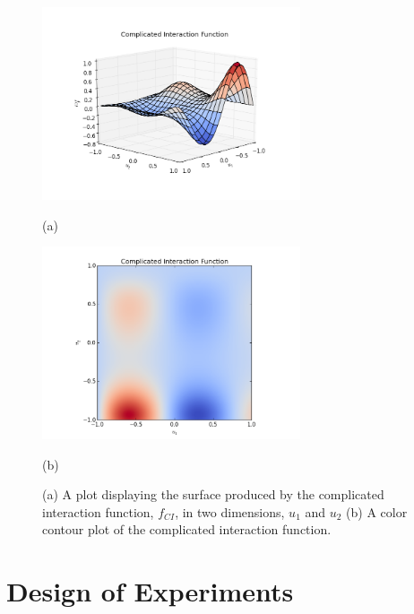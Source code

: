\documentclass[11pt]{afthesis}
\begin{document}
	
	
	\begin{figure}
		

		
   		\begin{minipage}[b]{0.5\linewidth}
   			\centering
   			\centerline{\includegraphics[width = 3in]{figures/complicated_interaction.png}}
   			\centerline{(a)}\medskip
   		\end{minipage}
   		\hfill
   		\begin{minipage}[b]{0.5\linewidth}
   			\centering
   			\centerline{\includegraphics[width = 3in]{figures/complicated_interaction_imshow.png}}
   			\centerline{(b)}\medskip
   		\end{minipage}
		
		\caption{(a) A plot displaying the surface produced by the complicated interaction function, $f_{CI}$, in two dimensions, $u_1$ and $u_2$ (b) A color contour plot of the complicated interaction function.}
		\label{fig:complicated_interaction}
		
		
	\end{figure}
	
	\section{Design of Experiments}
	
\end{document}
